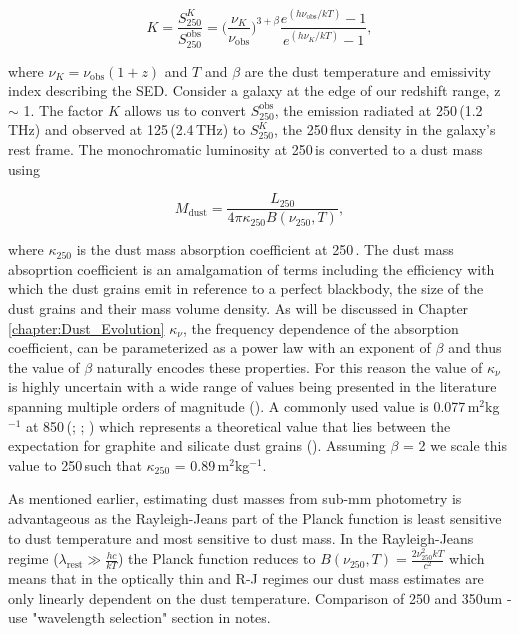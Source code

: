 \begin{equation}
    K = \frac{S_{250}^{K}}{S_{250}^{\textrm{obs}}} = \Bigg(\frac{\nu_{K}}{\nu_{\textrm{obs}}}\Bigg)^{3+\beta}\frac{e^{(h\nu_{\textrm{obs}}/kT)} - 1}{e^{(h\nu_{K}/kT)} - 1},
\label{eq:k_correction}
\end{equation}

where $\nu_{K} = \nu_{\textrm{obs}}(1+z)$ and $T$ and $\beta$ are the dust temperature and emissivity index describing the SED. Consider a galaxy at the edge of our redshift range, z $\sim$ 1. The factor $K$ allows us to convert $S_{250}^{\textrm{obs}}$, the emission radiated at 250\,\micron (1.2\,THz) and observed at 125\,\micron (2.4\,THz) to $S_{250}^{K}$, the 250\,\micron flux density in the galaxy's rest frame. The monochromatic luminosity at 250\,\micron is converted to a dust mass using

\begin{equation}
    M_{\textrm{dust}} = \frac{L_{250}}{4\pi\kappa_{250}B(\nu_{250}, T)},
\label{fig:dust_mass}
\end{equation}

where $\kappa_{250}$ is the dust mass absorption coefficient at 250\,\micron. The dust mass absoprtion coefficient is an amalgamation of terms including the efficiency with which the dust grains emit in reference to a perfect blackbody, the size of the dust grains and their mass volume density. As will be discussed in Chapter \ref{chapter:Dust_Evolution} $\kappa_\nu$, the frequency dependence of the absorption coefficient, can be parameterized as a power law with an exponent of $\beta$ and thus the value of $\beta$ naturally encodes these properties. For this reason the value of $\kappa_\nu$ is highly uncertain with a wide range of values being presented in the literature spanning multiple orders of magnitude (\citealt{Clark_2019}). A commonly used value is 0.077\,m$^{2}$kg$^{-1}$ at 850\,\micron (\citealt{Dunne_2000}; \citealt{daCunha_2008}; \citealt{Dunne_2011}) which represents a theoretical value that lies between the expectation for graphite and silicate dust grains (\citealt{Draine_1984}). Assuming $\beta$ = 2 we scale this value to 250\,\micron such that $\kappa_{250}$ = 0.89\,m$^{2}$kg$^{-1}$.

As mentioned earlier, estimating dust masses from sub-mm photometry is advantageous as the Rayleigh-Jeans part of the Planck function is least sensitive to dust temperature and most sensitive to dust mass. In the Rayleigh-Jeans regime ($\lambda_{\textrm{rest}} \gg \frac{hc}{kT}$) the Planck function reduces to $B(\nu_{250}, T) = \frac{2\nu_{250}^{2}kT}{c^2}$ which means that in the optically thin and R-J regimes our dust mass estimates are only linearly dependent on the dust temperature. {\color{red} Comparison of 250 and 350um - use "wavelength selection" section in notes.}

